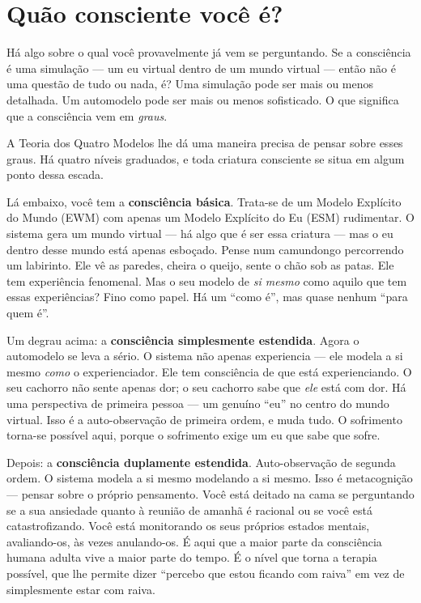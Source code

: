 \documentclass[11pt, twoside, openright]{book}
\begin{document}
\section*{Quão consciente você é?}

Há algo sobre o qual você provavelmente já vem se perguntando. Se a consciência é uma simulação --- um eu virtual dentro de um mundo virtual --- então não é uma questão de tudo ou nada, é? Uma simulação pode ser mais ou menos detalhada. Um automodelo pode ser mais ou menos sofisticado. O que significa que a consciência vem em \textit{graus}.

A Teoria dos Quatro Modelos lhe dá uma maneira precisa de pensar sobre esses graus. Há quatro níveis graduados, e toda criatura consciente se situa em algum ponto dessa escada.

Lá embaixo, você tem a \textbf{consciência básica}. Trata-se de um Modelo Explícito do Mundo (EWM) com apenas um Modelo Explícito do Eu (ESM) rudimentar. O sistema gera um mundo virtual --- há algo que é ser essa criatura --- mas o eu dentro desse mundo está apenas esboçado. Pense num camundongo percorrendo um labirinto. Ele vê as paredes, cheira o queijo, sente o chão sob as patas. Ele tem experiência fenomenal. Mas o seu modelo de \textit{si mesmo} como aquilo que tem essas experiências? Fino como papel. Há um ``como é'', mas quase nenhum ``para quem é''.

Um degrau acima: a \textbf{consciência simplesmente estendida}. Agora o automodelo se leva a sério. O sistema não apenas experiencia --- ele modela a si mesmo \textit{como} o experienciador. Ele tem consciência de que está experienciando. O seu cachorro não sente apenas dor; o seu cachorro sabe que \textit{ele} está com dor. Há uma perspectiva de primeira pessoa --- um genuíno ``eu'' no centro do mundo virtual. Isso é a auto-observação de primeira ordem, e muda tudo. O sofrimento torna-se possível aqui, porque o sofrimento exige um eu que sabe que sofre.

Depois: a \textbf{consciência duplamente estendida}. Auto-observação de segunda ordem. O sistema modela a si mesmo modelando a si mesmo. Isso é metacognição --- pensar sobre o próprio pensamento. Você está deitado na cama se perguntando se a sua ansiedade quanto à reunião de amanhã é racional ou se você está catastrofizando. Você está monitorando os seus próprios estados mentais, avaliando-os, às vezes anulando-os. É aqui que a maior parte da consciência humana adulta vive a maior parte do tempo. É o nível que torna a terapia possível, que lhe permite dizer ``percebo que estou ficando com raiva'' em vez de simplesmente estar com raiva.
\end{document}
